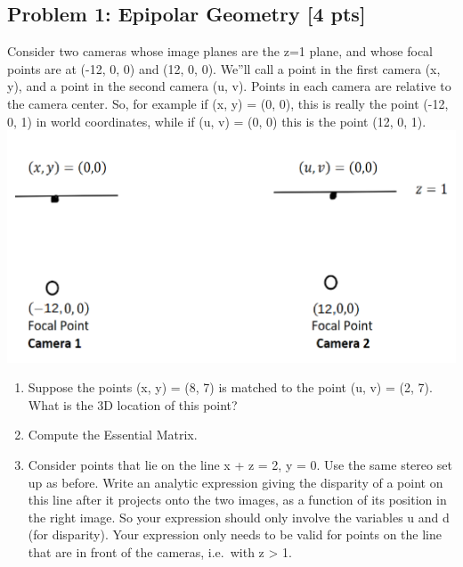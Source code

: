 \documentclass[11pt]{article}
\begin{document}
    \hypertarget{problem-1-epipolar-geometry-4-pts}{%
\subsection{Problem 1: Epipolar Geometry {[}4
pts{]}}\label{problem-1-epipolar-geometry-4-pts}}

Consider two cameras whose image planes are the z=1 plane, and whose
focal points are at (-12, 0, 0) and (12, 0, 0). We''ll call a point in
the first camera (x, y), and a point in the second camera (u, v). Points
in each camera are relative to the camera center. So, for example if (x,
y) = (0, 0), this is really the point (-12, 0, 1) in world coordinates,
while if (u, v) = (0, 0) this is the point (12, 0, 1).
\includegraphics{fig/fig1.png}

\begin{enumerate}
\def\labelenumi{\alph{enumi})}
\item
  Suppose the points (x, y) = (8, 7) is matched to the point (u, v) =
  (2, 7). What is the 3D location of this point?
\item
  Compute the Essential Matrix.
\item
  Consider points that lie on the line x + z = 2, y = 0. Use the same
  stereo set up as before. Write an analytic expression giving the
  disparity of a point on this line after it projects onto the two
  images, as a function of its position in the right image. So your
  expression should only involve the variables u and d (for disparity).
  Your expression only needs to be valid for points on the line that are
  in front of the cameras, i.e.~with z \textgreater{} 1.
\end{enumerate}
\end{document}
